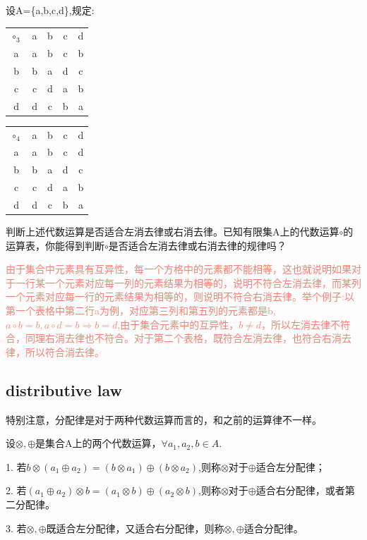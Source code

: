 \documentclass[
	11pt, %
	fleqn, %
	a4paper, %
]{LegrandOrangeBook}
\begin{document}
\begin{example}
	设A=\{a,b,c,d\},规定:
	\begin{center}
		\begin{table}[H]
			\centering
			\begin{tabular}{|c|c|c|c|c|}
				\cline{1-5}
				$\circ_3$ & a & b & c & d \\ \cline{1-5}
				a         & a & b & c & b \\ \cline{1-5}
				b         & b & a & d & c \\ \cline{1-5}
				c         & c & d & a & b \\ \cline{1-5}
				d         & d & c & b & a \\ \cline{1-5}
			\end{tabular}
		\end{table}
		\begin{table}[H]
			\centering
			\begin{tabular}{|c|c|c|c|c|}
				\cline{1-5}
				$\circ_4$ & a & b & c & d \\ \cline{1-5}
				a         & a & b & c & d \\ \cline{1-5}
				b         & b & a & d & c \\ \cline{1-5}
				c         & c & d & a & b \\ \cline{1-5}
				d         & d & c & b & a \\ \cline{1-5}
			\end{tabular}
		\end{table}
	\end{center}
	判断上述代数运算是否适合左消去律或右消去律。已知有限集A上的代数运算$\circ$的运算表，你能得到判断$\circ$是否适合左消去律或右消去律的规律吗？

	\textcolor{Salmon}{由于集合中元素具有互异性，每一个方格中的元素都不能相等，这也就说明如果对于一行某一个元素对应每一列的元素结果为相等的，说明不符合左消去律，而某列一个元素对应每一行的元素结果为相等的，则说明不符合右消去律。举个例子:以第一个表格中第二行a为例，对应第三列和第五列的元素都是b,$a\circ b=b,a\circ d=b\Rightarrow b=d$,由于集合元素中的互异性，$b\not=d$，所以左消去律不符合，同理右消去律也不符合。对于第二个表格，既符合左消去律，也符合右消去律，所以符合消去律。}
\end{example}

\subsection{distributive law}
特别注意，分配律是对于两种代数运算而言的，和之前的运算律不一样。
\begin{theorem}

	设$\otimes,\oplus$是集合A上的两个代数运算，$\forall a_1,a_2,b\in A$.

	1. 若$b\otimes(a_1\oplus a_2)=(b\otimes a_1)\oplus(b\otimes a_2)$,则称$\otimes$对于$\oplus$适合左分配律；

	2. 若$(a_1\oplus a_2)\otimes b=(a_1\otimes b)\oplus(a_2\otimes b)$,则称$\otimes$对于$\oplus$适合右分配律，或者第二分配律。

	3. 若$\otimes,\oplus$既适合左分配律，又适合右分配律，则称$\otimes,\oplus$适合分配律。
\end{theorem}
\end{document}
